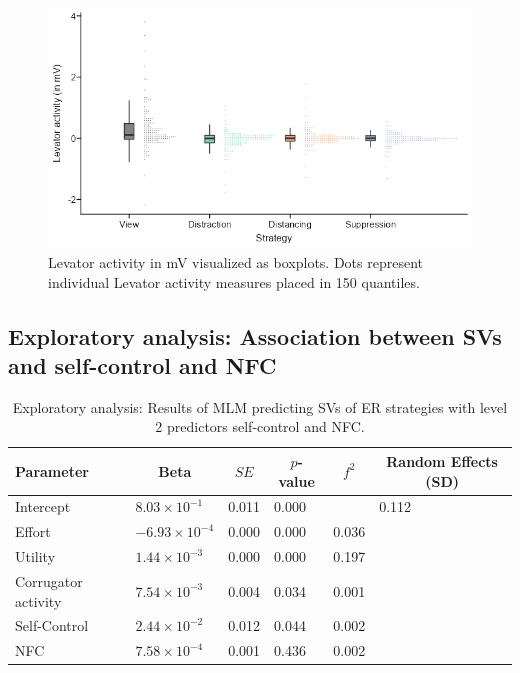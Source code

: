 \documentclass[
  man,floatsintext]{apa6}
\begin{document}
\begin{figure}[H]
\includegraphics[width=\textwidth]{figures/FigLevReg} \caption{Levator activity in mV visualized as boxplots. Dots represent individual Levator activity measures placed in 150 quantiles.}\label{fig:SupplFigLevReg}
\end{figure}

\newpage

\hypertarget{exploratory-analysis-association-between-svs-and-self-control-and-nfc}{%
\subsection{Exploratory analysis: Association between SVs and self-control and NFC}\label{exploratory-analysis-association-between-svs-and-self-control-and-nfc}}

\begin{table}[H]

\begin{center}
\begin{threeparttable}

\caption{\label{tab:TabExp}Exploratory analysis: Results of MLM predicting SVs of ER strategies with level 2 predictors self-control and NFC.}

\begin{tabular}{llllll}
\toprule
Parameter & \multicolumn{1}{c}{Beta} & \multicolumn{1}{c}{$SE$} & \multicolumn{1}{c}{$p$-value} & \multicolumn{1}{c}{$f^{2}$} & \multicolumn{1}{c}{Random Effects (SD)}\\
\midrule
Intercept & $8.03 \times 10^{-1}$ & 0.011 & 0.000 &  & 0.112\\
Effort & $-6.93 \times 10^{-4}$ & 0.000 & 0.000 & 0.036 & \\
Utility & $1.44 \times 10^{-3}$ & 0.000 & 0.000 & 0.197 & \\
Corrugator activity & $7.54 \times 10^{-3}$ & 0.004 & 0.034 & 0.001 & \\
Self-Control & $2.44 \times 10^{-2}$ & 0.012 & 0.044 & 0.002 & \\
NFC & $7.58 \times 10^{-4}$ & 0.001 & 0.436 & 0.002 & \\
\bottomrule
\end{tabular}

\end{threeparttable}
\end{center}

\end{table}
\end{document}
